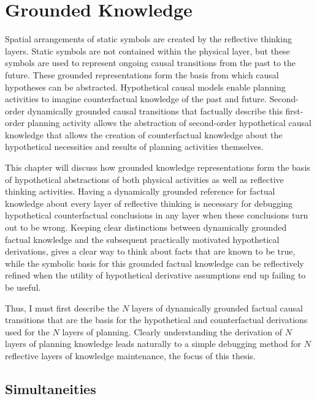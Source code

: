 \chapter{Grounded Knowledge}
\label{chapter:grounded_knowledge}

Spatial arrangements of static symbols are created by the reflective
thinking layers.  Static symbols are not contained within the physical
layer, but these symbols are used to represent ongoing causal
transitions from the past to the future.  These grounded
representations form the basis from which causal hypotheses can be
abstracted.  Hypothetical causal models enable planning activities to
imagine counterfactual knowledge of the past and future.  Second-order
dynamically grounded causal transitions that factually describe this
first-order planning activity allows the abstraction of second-order
hypothetical causal knowledge that allows the creation of
counterfactual knowledge about the hypothetical necessities and
results of planning activities themselves.

This chapter will discuss how grounded knowledge representations form
the basis of hypothetical abstractions of both physical activities as
well as reflective thinking activities.  Having a dynamically grounded
reference for factual knowledge about every layer of reflective
thinking is necessary for debugging hypothetical counterfactual
conclusions in any layer when these conclusions turn out to be wrong.
Keeping clear distinctions between dynamically grounded factual
knowledge and the subsequent practically motivated hypothetical
derivations, gives a clear way to think about facts that are known to
be true, while the symbolic basis for this grounded factual knowledge
can be reflectively refined when the utility of hypothetical
derivative assumptions end up failing to be useful.

Thus, I must first describe the $N$ layers of dynamically grounded
factual causal transitions that are the basis for the hypothetical and
counterfactual derivations used for the $N$ layers of planning.
Clearly understanding the derivation of $N$ layers of planning
knowledge leads naturally to a simple debugging method for $N$
reflective layers of knowledge maintenance, the focus of this thesis.

\section{Simultaneities}

